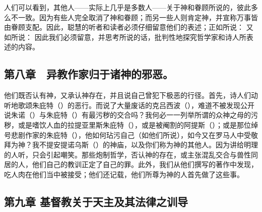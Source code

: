 人们可以看到，其他人——实际上几乎是多数人——关于神和眷顾所说的，彼此多么不一致。因为有些人完全取消了神和眷顾；而另一些人则肯定神，并宣称万事皆由眷顾支配。因此，聪慧的听者和读者必须仔细留意他们的表述；正如所说： 又如所说： 因此我们必须留意，并思考所说的话，批判性地探究哲学家和诗人所表述的内容。\par


\subsection{第八章　异教作家归于诸神的邪恶。}

他们既否认有神，又承认神存在，并且说自己曾犯下极恶的行径。首先，诗人们动听地歌颂朱庇特（）的恶行。而说了大量废话的克吕西波（），难道不被发现公开说朱诺（）与朱庇特（）有最污秽的交合吗？我何必一一列举所谓的众神之母的污秽，或是嗜饮人血的拉提亚里斯朱庇特（），或是被阉割的阿提斯（）；或是那位绰号悲剧作家的朱庇特（），他如何玷污自己（如他们所说），如今又在罗马人中受敬拜为神？我不提安提诺乌斯（）的神庙，以及你们称为神的其他人。因为讲给明理的人听，只会引起嘲笑。那些炮制哲学，否认神的存在，或主张混乱交合与兽性同居的人，他们自己的教训正定了自己的罪。此外，我们从他们撰写的著作中发现，吃人肉在他们当中被接受；他们还记载，他们所尊为神的人首先做了这些事。\par


\subsection{第九章 基督教关于天主及其法律之训导}

